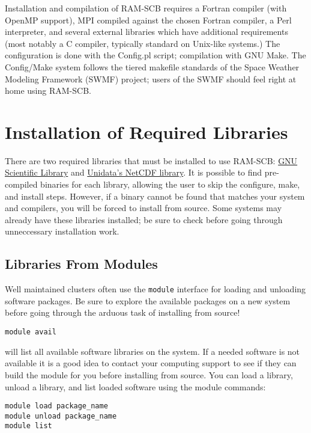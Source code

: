 Installation and compilation of RAM-SCB requires a Fortran compiler (with OpenMP support), MPI compiled against the chosen Fortran compiler, a Perl interpreter, and several external libraries which have additional requirements (most notably a C compiler, typically standard on Unix-like systems.)  The configuration is done with the Config.pl script; compilation with GNU Make.  The Config/Make system follows the tiered makefile standards of the Space Weather Modeling Framework (SWMF) project; users of the SWMF should feel right at home using RAM-SCB.

\section{Installation of Required Libraries}

There are two required libraries that must be installed to use RAM-SCB: \href{https://www.gnu.org/software/gsl}{GNU Scientific Library} and \href{http://www.unidata.ucar.edu/software/netcdf/}{Unidata's NetCDF library}. It is possible to find pre-compiled binaries for each library, allowing the user to skip the configure, make, and install steps. However, if a binary cannot be found that matches your system and compilers, you will be forced to install from source. Some systems may already have these libraries installed; be sure to check before going through unneccessary installation work.

\subsection{Libraries From Modules}
Well maintained clusters often use the {\tt module} interface for loading and unloading software packages.  Be sure to explore the available packages on a new system before going through the arduous task of installing from source!

\begin{verbatim}
module avail
\end{verbatim}
\noindent
will list all available software libraries on the system.  If a needed software is not available it is a good idea to contact your computing support to see if they can build the module for you before installing from source. You can load a library, unload a library, and list loaded software using the module commands:

\begin{verbatim}
module load package_name
module unload package_name
module list
\end{verbatim}

